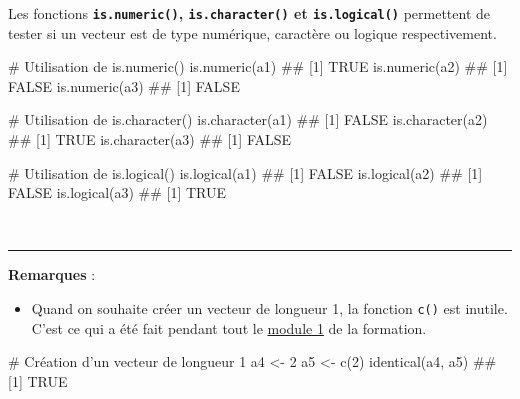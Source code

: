\documentclass[12pt,twosided, notitlepage]{book}
\newenvironment{Shaded}{}{}
\newcommand{\CommentTok}[1]{\textcolor[rgb]{0.00,0.50,0.00}{#1}}
\newcommand{\DecValTok}[1]{#1}
\newcommand{\KeywordTok}[1]{\textcolor[rgb]{0.00,0.00,1.00}{#1}}
\newcommand{\NormalTok}[1]{#1}
\newcommand{\StringTok}[1]{\textcolor[rgb]{0.00,0.50,0.50}{#1}}
\providecommand{\tightlist}{%
  \setlength{\itemsep}{0pt}\setlength{\parskip}{0pt}}
\renewenvironment{Shaded}{\begin{snugshade}}{\end{snugshade}}
\begin{document}
Les fonctions \textbf{\texttt{is.numeric()}, \texttt{is.character()} et
\texttt{is.logical()}}
permettent de tester si un vecteur est de type numérique, caractère ou
logique respectivement.

\begin{Shaded}
\begin{Highlighting}[]
\CommentTok{# Utilisation de is.numeric()}
\KeywordTok{is.numeric}\NormalTok{(a1)}
\NormalTok{  ## [1] TRUE}
\KeywordTok{is.numeric}\NormalTok{(a2)}
\NormalTok{  ## [1] FALSE}
\KeywordTok{is.numeric}\NormalTok{(a3)}
\NormalTok{  ## [1] FALSE}

\CommentTok{# Utilisation de is.character()}
\KeywordTok{is.character}\NormalTok{(a1)}
\NormalTok{  ## [1] FALSE}
\KeywordTok{is.character}\NormalTok{(a2)}
\NormalTok{  ## [1] TRUE}
\KeywordTok{is.character}\NormalTok{(a3)}
\NormalTok{  ## [1] FALSE}

\CommentTok{# Utilisation de is.logical()}
\KeywordTok{is.logical}\NormalTok{(a1)}
\NormalTok{  ## [1] FALSE}
\KeywordTok{is.logical}\NormalTok{(a2)}
\NormalTok{  ## [1] FALSE}
\KeywordTok{is.logical}\NormalTok{(a3)}
\NormalTok{  ## [1] TRUE}
\end{Highlighting}
\end{Shaded}

~

\begin{center}\rule{0.5\linewidth}{\linethickness}\end{center}

\textbf{Remarques} :

\begin{itemize}
\tightlist
\item
  Quand on souhaite créer un vecteur de longueur 1, la fonction
  \texttt{c()} est inutile. C'est ce qui a été fait pendant tout le
  \underline{module 1} de la formation.
\end{itemize}

\begin{Shaded}
\begin{Highlighting}[]
\CommentTok{# Création d'un vecteur de longueur 1}
\NormalTok{a4 <-}\StringTok{ }\DecValTok{2}
\NormalTok{a5 <-}\StringTok{ }\KeywordTok{c}\NormalTok{(}\DecValTok{2}\NormalTok{)}
\KeywordTok{identical}\NormalTok{(a4, a5)}
\NormalTok{  ## [1] TRUE}
\end{Highlighting}
\end{Shaded}
\end{document}

